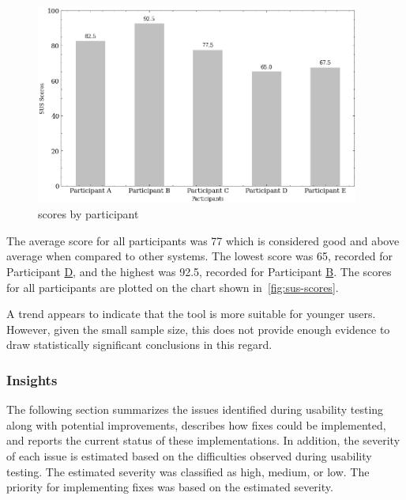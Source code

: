 \begin{figure}[h!]
\centering
\includegraphics[width=0.95\textwidth]{images/graph_sus.png}
\caption{ scores by participant}
\label{fig:sus-scores}
\end{figure}


The average  score for all participants was 77 which is considered good and above average when compared to other systems. The lowest  score was 65, recorded for Participant \hyperref[itm:D]{D}, and the highest was 92.5, recorded for Participant \hyperref[itm:B]{B}. The scores for all participants are plotted on the chart shown in~\autoref{fig:sus-scores}.

A trend appears to indicate that the tool is more suitable for younger users. However, given the small sample size, this does not provide enough evidence to draw statistically significant conclusions in this regard.

\subsubsection{Insights} \label{section:insights}

The following section summarizes the issues identified during usability testing along with potential improvements, describes how fixes could be implemented, and reports the current status of these implementations. In addition, the severity of each issue is estimated based on the difficulties observed during usability testing. The estimated severity was classified as high, medium, or low. The priority for implementing fixes was based on the estimated severity.

